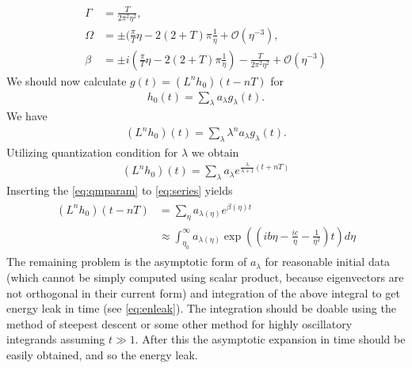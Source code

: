\documentclass[
a4paper,%
10pt,%
titlepage,%
twoside%
]{article}
\begin{document}
\begin{align}\label{eq:qmparam}
  \Gamma&=\frac{T}{2\pi^2\eta^2},\\
  \Omega&=\pm(\frac{\pi}{T}\eta-2(2+T)\pi\frac{1}{\eta}+\mathcal{O}(\eta^{-3}),\\
  \beta&=\pm i(\frac{\pi}{T}\eta-2(2+T)\pi\frac{1}{\eta})-\frac{T}{2\pi^2\eta^2}+\mathcal{O}(\eta^{-3})
\end{align}
We should now calculate $g(t)=(L^n h_0)(t-nT)$ for
\begin{gather}
  h_0(t)=\sum_\lambda a_\lambda g_\lambda(t).
\end{gather}
We have
\begin{gather}
  (L^n h_0)(t)=\sum_\lambda \lambda^n a_\lambda g_\lambda(t).
\end{gather}
Utilizing quantization condition for $\lambda$ we obtain
\begin{gather}\label{eq:series}
  (L^n h_0)(t) =\sum_\lambda a_\lambda e^{\frac{\lambda}{\lambda+1}(t+nT)}
\end{gather}
Inserting the \eqref{eq:qmparam} to \eqref{eq:series} yields
\begin{gather}
  \begin{split}
    (L^n h_0)(t-nT) &=\sum_\eta a_{\lambda(\eta)} e^{\beta(\eta)t}\\
    &\approx \int_{\eta_0}^\infty a_{\lambda(\eta)}\exp((ib\eta-\frac{ic}{\eta}-\frac{1}{\eta^2})t)d\eta
  \end{split}
\end{gather}
The remaining problem is the asymptotic form of $a_{\lambda}$ for
reasonable initial data (which cannot be simply computed using scalar
product, because eigenvectors are not orthogonal in their current
form) and integration of the above integral to get energy leak in time
(see \eqref{eq:enleak}). The integration should be doable using the
method of steepest descent or some other method for highly oscillatory
integrands assuming $t\gg 1$. After this the asymptotic expansion in
time should be easily obtained, and so the energy leak.

\end{document}
